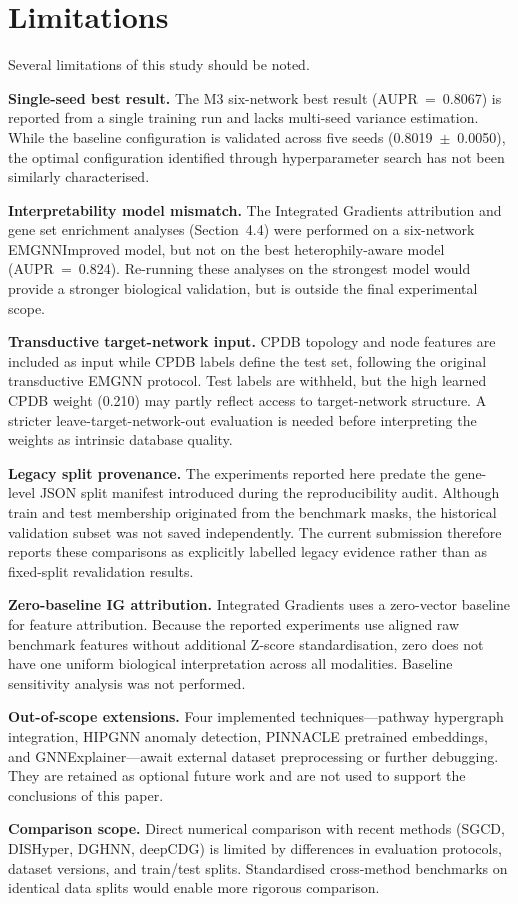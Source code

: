 
\section{Limitations}

Several limitations of this study should be noted.

\textbf{Single-seed best result.} The M3 six-network best result
(AUPR~=~0.8067) is reported from a single training run and lacks multi-seed
variance estimation. While the baseline configuration is validated across five
seeds (0.8019~$\pm$~0.0050), the optimal configuration identified through
hyperparameter search has not been similarly characterised.

\textbf{Interpretability model mismatch.} The Integrated Gradients attribution
and gene set enrichment analyses (Section~4.4) were performed on a six-network
EMGNNImproved model, but not on the best heterophily-aware model
(AUPR~=~0.824). Re-running these analyses on the strongest model would provide
a stronger biological validation, but is outside the final experimental scope.

\textbf{Transductive target-network input.} CPDB topology and node features are
included as input while CPDB labels define the test set, following the original
transductive EMGNN protocol. Test labels are withheld, but the high learned CPDB
weight (0.210) may partly reflect access to target-network structure. A stricter
leave-target-network-out evaluation is needed before interpreting the weights as
intrinsic database quality.

\textbf{Legacy split provenance.} The experiments reported here predate the
gene-level JSON split manifest introduced during the reproducibility audit.
Although train and test membership originated from the benchmark masks, the
historical validation subset was not saved independently. The current submission
therefore reports these comparisons as explicitly labelled legacy evidence rather
than as fixed-split revalidation results.

\textbf{Zero-baseline IG attribution.} Integrated Gradients uses a zero-vector
baseline for feature attribution. Because the reported experiments use aligned
raw benchmark features without additional Z-score standardisation, zero does not
have one uniform biological interpretation across all modalities. Baseline
sensitivity analysis was not performed.

\textbf{Out-of-scope extensions.} Four implemented techniques---pathway hypergraph
integration, HIPGNN anomaly detection, PINNACLE pretrained embeddings, and
GNNExplainer---await external dataset preprocessing or further debugging. They are
retained as optional future work and are not used to support the conclusions of
this paper.

\textbf{Comparison scope.} Direct numerical comparison with recent methods
(SGCD, DISHyper, DGHNN, deepCDG) is limited by differences in evaluation
protocols, dataset versions, and train/test splits. Standardised cross-method
benchmarks on identical data splits would enable more rigorous comparison.
